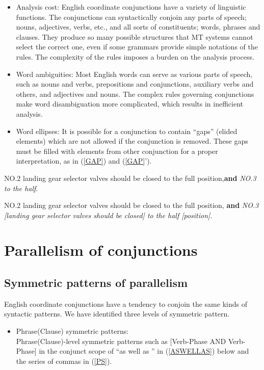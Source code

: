 \begin{itemize}
    \item Analysis cost:
English coordinate conjunctions have a variety of linguistic
functions. The conjunctions can syntactically conjoin any parts of
speech; nouns, adjectives, verbs, etc., and all sorts of
constituents; words, phrases and clauses.
They produce so many possible structures that MT systems cannot
select the correct one, even if some grammars provide
simple notations of the rules.
The complexity of the rules imposes a burden on the analysis process.

    \item Word ambiguities:
Most English words can serve as various parts of speech,
such as nouns and verbs, prepositions and conjunctions, auxiliary verbs and
others, and adjectives and nouns.  The complex rules governing conjunctions
make word disambiguation more complicated, which results in inefficient analysis.

    \item Word ellipses:
It is possible for a conjunction to contain ``gaps'' (elided elements)
which are not allowed if the conjunction is removed.
These gaps must be filled with elements from other conjunction for a
proper interpretation, as in (\ref{GAP}) and (\ref{GAP}').
\end{itemize}

  \mylistin
    \item  NO.2 landing gear selector valves should be closed to the
full position,{\bf and} {\sl NO.3 to the half}.\label{GAP} 
    \item[(\ref{GAP}')] \rm
NO.2 landing gear selector valves should be closed to the full position,
{\bf and} {\sl NO.3 [landing gear selector valves should be closed]
to the half [position]}.
  \mylistend

\section{Parallelism of conjunctions}
\subsection{Symmetric patterns of parallelism}

English coordinate conjunctions have a tendency to conjoin the same
kinds of syntactic patterns.  We have identified three levels of symmetric
pattern.

  \begin{itemize}
    \item Phrase(Clause) symmetric patterns: \\
Phrase(Clause)-level symmetric patterns such as [Verb-Phase AND
 Verb-Phase] in the conjunct scope of ``as well as '' in
(\ref{ASWELLAS}) below and the series of commas in (\ref{PS}).
  \end{itemize}

